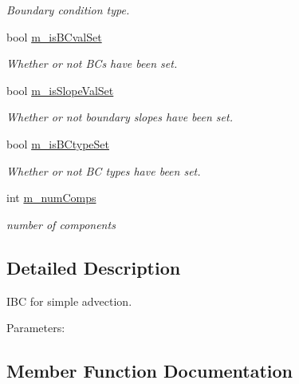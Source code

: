 \begin{DoxyCompactItemize}
\begin{DoxyCompactList}\small\item\em Boundary condition type. \end{DoxyCompactList}\item 
\mbox{\label{class_advect_i_b_c_a3efbc8664456083ae4d71de9a7b17312}} 
bool \hyperlink{class_advect_i_b_c_a3efbc8664456083ae4d71de9a7b17312}{m\+\_\+is\+B\+Cval\+Set}
\begin{DoxyCompactList}\small\item\em Whether or not B\+Cs have been set. \end{DoxyCompactList}\item 
\mbox{\label{class_advect_i_b_c_afd9c2bb5aa7834ea549538f060857ba9}} 
bool \hyperlink{class_advect_i_b_c_afd9c2bb5aa7834ea549538f060857ba9}{m\+\_\+is\+Slope\+Val\+Set}
\begin{DoxyCompactList}\small\item\em Whether or not boundary slopes have been set. \end{DoxyCompactList}\item 
\mbox{\label{class_advect_i_b_c_acccc5b94b75465b61128a7b8075516ae}} 
bool \hyperlink{class_advect_i_b_c_acccc5b94b75465b61128a7b8075516ae}{m\+\_\+is\+B\+Ctype\+Set}
\begin{DoxyCompactList}\small\item\em Whether or not BC types have been set. \end{DoxyCompactList}\item 
\mbox{\label{class_advect_i_b_c_afcdc8bf740b7e44790927adce875cf59}} 
int \hyperlink{class_advect_i_b_c_afcdc8bf740b7e44790927adce875cf59}{m\+\_\+num\+Comps}
\begin{DoxyCompactList}\small\item\em number of components \end{DoxyCompactList}\end{DoxyCompactItemize}


\subsection{Detailed Description}
I\+BC for simple advection. 

Parameters\+: 

\subsection{Member Function Documentation}
\mbox{\label{class_advect_i_b_c_abd44c883d18c238c99456b57d974f9dc}} 
